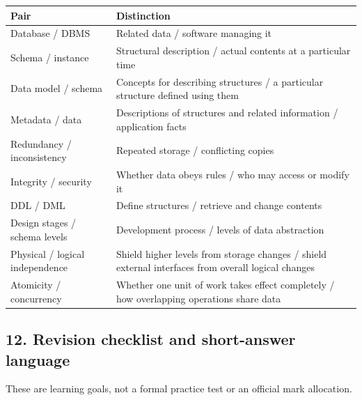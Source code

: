 \begin{longtable}[]{@{}
  >{\raggedright\arraybackslash}p{}
  >{\raggedright\arraybackslash}p{}@{}}
\toprule\noalign{}
\begin{minipage}[b]{\linewidth}\raggedright
Pair
\end{minipage} & \begin{minipage}[b]{\linewidth}\raggedright
Distinction
\end{minipage} \\
\midrule\noalign{}
\endhead
\bottomrule\noalign{}
\endlastfoot
Database / DBMS & Related data / software managing it \\
Schema / instance & Structural description / actual contents at a particular time \\
Data model / schema & Concepts for describing structures / a particular structure defined using them \\
Metadata / data & Descriptions of structures and related information / application facts \\
Redundancy / inconsistency & Repeated storage / conflicting copies \\
Integrity / security & Whether data obeys rules / who may access or modify it \\
DDL / DML & Define structures / retrieve and change contents \\
Design stages / schema levels & Development process / levels of data abstraction \\
Physical / logical independence & Shield higher levels from storage changes / shield external interfaces from overall logical changes \\
Atomicity / concurrency & Whether one unit of work takes effect completely / how overlapping operations share data \\
\end{longtable}

\subsection{12. Revision checklist and short-answer language}\label{01_database_fundamentals_en-revision-checklist-and-short-answer-language}

These are learning goals, not a formal practice test or an official mark allocation.


